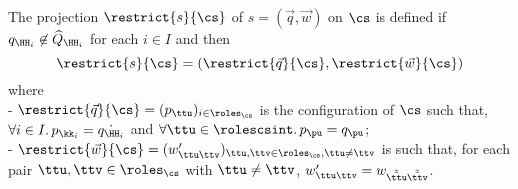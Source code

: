 \begin{definition}
\noindent
The projection $\restrict{s}{\cs}$ of $s= (\vec{q},\vec{w})$ on $\cs$  is defined
if ${q}_{\HH_i}\not\in \widehat Q_{\HH_i}$  for each $i \in I$ and
then
$$\restrict{s}{\cs}=(\restrict{\vec{q}}{\cs},\restrict{\vec{w}}{\cs})$$
where\\
 - $\restrict{\vec{q}}{\cs} = (p_{\ttu})_{i\in  \roles_{\cs} }$ is the configuration of $\cs$ such that,  $\forall i \in   I.\,p_{\kk_i} = \dot{q_{\HH_i}}$  and  $\forall \ttu \in   \rolescsint.\,p_{\pu} = q_{\pu}$;\\
- $\restrict{\vec{w}}{\cs} =  (w'_{\ttu\ttv})_{\ttu,\ttv\in \roles_{\cs},\ttu\neq\ttv}$
is such that, for each pair $\ttu,\ttv\in \roles_{\cs}$ with $\ttu\neq\ttv$, 
 $w'_{\ttu\ttv} = w_{\tilde{\tilde{\ttu}}\tilde{\tilde{\ttv}}}$.
%


\end{definition}
